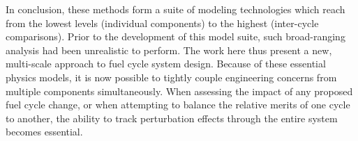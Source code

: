 In conclusion, these methods form a suite of modeling technologies which reach from the lowest levels
(individual components) to the highest (inter-cycle comparisons).
Prior to the development of this model suite, such broad-ranging analysis had been unrealistic to perform.
The work here thus present a new, multi-scale approach to fuel cycle system design.  
Because of these essential physics models, it is now possible to tightly couple engineering 
concerns from multiple components simultaneously.  When assessing the impact of any 
proposed fuel cycle change, or when attempting to balance the relative merits of one 
cycle to another, the ability to track perturbation effects through the entire system becomes
essential.
